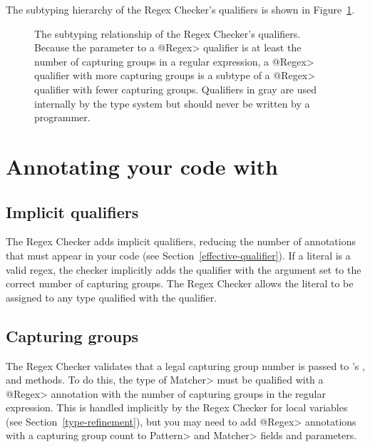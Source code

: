 The subtyping hierarchy of the Regex Checker's qualifiers is shown in
Figure~\ref{fig-regex-hierarchy}.

\begin{figure}
\caption{The subtyping relationship of the Regex Checker's qualifiers.
  Because the parameter to a \<@Regex> qualifier is at least the number of
  capturing groups in a regular expression, a \<@Regex> qualifier with more
  capturing groups is a subtype of a \<@Regex> qualifier with fewer capturing
  groups. Qualifiers in gray are used internally by the type
  system but should never be written by a programmer.}
\label{fig-regex-hierarchy}
\end{figure}

\section{Annotating your code with \label{annotating-with-regex}}


\subsection{Implicit qualifiers\label{regex-implicit-qualifiers}}

The Regex Checker adds
implicit qualifiers, reducing the number of annotations that must appear
in your code (see Section~\ref{effective-qualifier}).
If a  literal is a valid regex,
the checker implicitly adds the  qualifier with
the argument set to the correct number of capturing groups.
The Regex Checker allows
the  literal to be assigned to any type qualified with the
 qualifier.


\subsection{Capturing groups\label{regex-capturing-groups}}

The Regex Checker validates that a legal capturing group number is passed
to 's
,
 and
 methods. To do this,
the type of \<Matcher> must be qualified with a \<@Regex> annotation
with the number of capturing groups in the regular expression. This is
handled implicitly by the Regex Checker for local variables (see
Section~\ref{type-refinement}), but you may need to add \<@Regex> annotations
with a capturing group count to \<Pattern> and \<Matcher> fields and
parameters.


